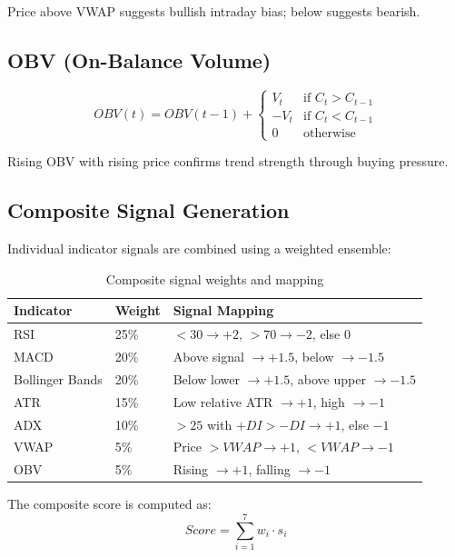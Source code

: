 \documentclass[12pt, a4paper, oneside]{report}
\begin{document}
Price above VWAP suggests bullish intraday bias; below suggests bearish.

\subsection{OBV (On-Balance Volume)}

\begin{equation}
    OBV(t) = OBV(t-1) + \begin{cases} V_t & \text{if } C_t > C_{t-1} \\ -V_t & \text{if } C_t < C_{t-1} \\ 0 & \text{otherwise} \end{cases}
\end{equation}

Rising OBV with rising price confirms trend strength through buying pressure.

\subsection{Composite Signal Generation}

Individual indicator signals are combined using a weighted ensemble:

\begin{table}[H]
\centering
\caption{Composite signal weights and mapping}
\label{tab:signal_weights}
\begin{tabular}{@{}lll@{}}
\toprule
\textbf{Indicator} & \textbf{Weight} & \textbf{Signal Mapping} \\
\midrule
RSI & 25\% & $<30 \to +2$, $>70 \to -2$, else $0$ \\
MACD & 20\% & Above signal $\to +1.5$, below $\to -1.5$ \\
Bollinger Bands & 20\% & Below lower $\to +1.5$, above upper $\to -1.5$ \\
ATR & 15\% & Low relative ATR $\to +1$, high $\to -1$ \\
ADX & 10\% & $>25$ with $+DI > -DI \to +1$, else $-1$ \\
VWAP & 5\% & Price $> VWAP \to +1$, $< VWAP \to -1$ \\
OBV & 5\% & Rising $\to +1$, falling $\to -1$ \\
\bottomrule
\end{tabular}
\end{table}

The composite score is computed as:
\begin{equation}
    Score = \sum_{i=1}^{7} w_i \cdot s_i
\end{equation}
\end{document}
